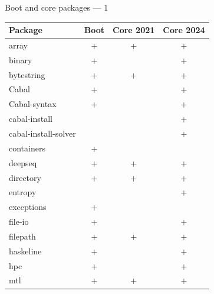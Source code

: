 \documentclass[handout]{beamer}
\begin{document}
\begin{frame}{Boot and core packages --- 1}


\vspace{-0.5em}

\begin{table}[c]
\begin{tabular}{lccc}
Package          & Boot              & Core 2021 & Core 2024          \\
\hline
array            & +                 & +         & +                  \\
binary           & +                 &           & \cellcolor{green}+ \\
bytestring       & +                 & +         & +                  \\
Cabal            & +                 &           & \cellcolor{green}+ \\
Cabal-syntax     & +                 &           & \cellcolor{green}+ \\
cabal-install    &                   &           & \cellcolor{green}+ \\
cabal-install-solver &               &           & \cellcolor{green}+ \\
containers       & \cellcolor{red}+  &           &                    \\
deepseq          & +                 & +         & +                  \\
directory        & +                 & +         & +                  \\
entropy          &                   &           & \cellcolor{green}+ \\
exceptions       & \cellcolor{red}+  &           &                    \\
file-io          & +                 &           & \cellcolor{green}+ \\
filepath         & +                 & +         & +                  \\
haskeline        & +                 &           & \cellcolor{green}+ \\
hpc              & +                 &           & \cellcolor{green}+ \\
mtl              & +                 & +         & +                  \\
\end{tabular}
\end{table}

\end{frame}
\end{document}
